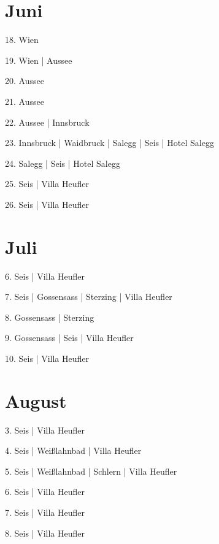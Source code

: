 \documentclass[twoside=false,titlepage=false,open=any, parskip=never, fontsize=10pt, headings=small, chapterprefix=false, appendixprefix=false, DIV=15]{scrbook}
\begin{document}
\begin{multicols}{3}
            \section*{Juni}
            18. Wien\par
            19. Wien | Aussee\par
            20. Aussee\par
            21. Aussee\par
            22. Aussee | Innsbruck\par
            23. Innsbruck | Waidbruck | Salegg | Seis | Hotel Salegg\par
            24. Salegg | Seis | Hotel Salegg\par
            25. Seis | Villa Heufler\par
            26. Seis | Villa Heufler\par
            \section*{Juli}
            6. Seis | Villa Heufler\par
            7. Seis | Gossensass | Sterzing | Villa Heufler\par
            8. Gossensass | Sterzing\par
            9. Gossensass | Seis | Villa Heufler\par
            10. Seis | Villa Heufler\par
            \section*{August}
            3. Seis | Villa Heufler\par
            4. Seis | Weißlahnbad | Villa Heufler\par
            5. Seis | Weißlahnbad | Schlern | Villa Heufler\par
            6. Seis | Villa Heufler\par
            7. Seis | Villa Heufler\par
            8. Seis | Villa Heufler\par

\end{multicols}
\end{document}
